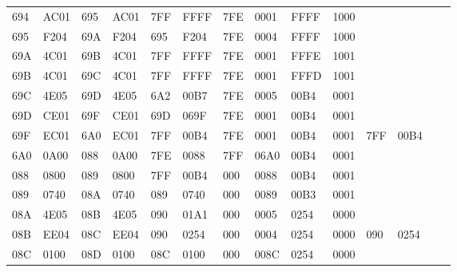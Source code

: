 \begin{tabular}{|*{14}{l|}}
694 & AC01 & 695 & AC01 & 7FF & FFFF & 7FE & 0001 & FFFF & 1000 & &\\
695 & F204 & 69A & F204 & 695 & F204 & 7FE & 0004 & FFFF & 1000 & &\\
69A & 4C01 & 69B & 4C01 & 7FF & FFFF & 7FE & 0001 & FFFE & 1001 & &\\
69B & 4C01 & 69C & 4C01 & 7FF & FFFF & 7FE & 0001 & FFFD & 1001 & &\\
69C & 4E05 & 69D & 4E05 & 6A2 & 00B7 & 7FE & 0005 & 00B4 & 0001 & &\\
69D & CE01 & 69F & CE01 & 69D & 069F & 7FE & 0001 & 00B4 & 0001 & &\\
69F & EC01 & 6A0 & EC01 & 7FF & 00B4 & 7FE & 0001 & 00B4 & 0001 & 7FF & 00B4\\
6A0 & 0A00 & 088 & 0A00 & 7FE & 0088 & 7FF & 06A0 & 00B4 & 0001 & &\\
088 & 0800 & 089 & 0800 & 7FF & 00B4 & 000 & 0088 & 00B4 & 0001 & &\\
089 & 0740 & 08A & 0740 & 089 & 0740 & 000 & 0089 & 00B3 & 0001 & &\\
08A & 4E05 & 08B & 4E05 & 090 & 01A1 & 000 & 0005 & 0254 & 0000 & &\\
08B & EE04 & 08C & EE04 & 090 & 0254 & 000 & 0004 & 0254 & 0000 & 090 & 0254\\
08C & 0100 & 08D & 0100 & 08C & 0100 & 000 & 008C & 0254 & 0000 & &\\\hline
\end{tabular}
